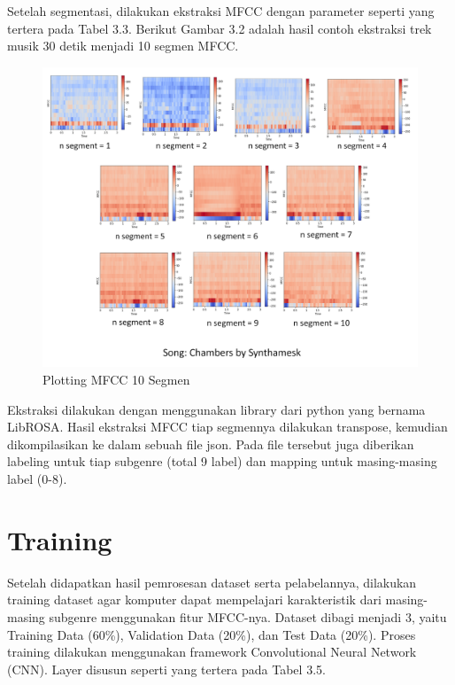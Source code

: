 Setelah segmentasi, dilakukan ekstraksi MFCC dengan parameter seperti yang tertera pada Tabel 3.3. Berikut Gambar 3.2 adalah hasil contoh ekstraksi trek musik 30 detik menjadi 10 segmen MFCC.

\begin{figure}[H]
	\centering
	
	\includegraphics[width=\textwidth]{gambar/mfcc segments1}
	
	\caption{Plotting MFCC 10 Segmen}
	\label{fig:mfccsegmen}
\end{figure}

Ekstraksi dilakukan dengan menggunakan library dari python yang bernama LibROSA. Hasil ekstraksi MFCC tiap segmennya dilakukan transpose, kemudian dikompilasikan ke dalam sebuah file json. Pada file tersebut juga diberikan labeling untuk tiap subgenre (total 9 label) dan mapping untuk masing-masing label (0-8).

\section{Training}
\label{sec:training}

Setelah didapatkan hasil pemrosesan dataset serta pelabelannya, dilakukan training dataset agar komputer dapat mempelajari karakteristik dari masing-masing subgenre menggunakan fitur MFCC-nya. Dataset dibagi menjadi 3, yaitu Training Data (60\%), Validation Data (20\%), dan Test Data (20\%). Proses training dilakukan menggunakan framework Convolutional Neural Network (CNN). Layer disusun seperti yang tertera pada Tabel 3.5.

